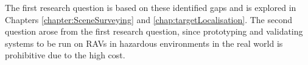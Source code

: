 The first research question is based on these identified gaps and is explored in Chapters \ref{chapter:SceneSurveying} and \ref{chap:targetLocalisation}. The second question arose from the first research question, since prototyping and validating systems to be run on RAVs in hazardous environments in the real world is prohibitive due to the high cost.